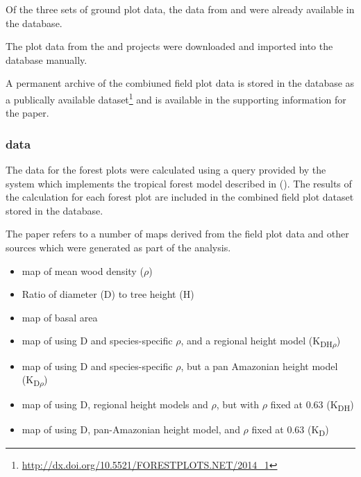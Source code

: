 \documentclass{article}
\begin{document}
Of the three sets of ground plot data, the data from \cite{rainfor} and
\cite{atdn} were already available in the \cite{forest-plots} database.

The plot data from the \cite{team} and \cite{ppbio} projects were
downloaded and imported into the \cite{forest-plots} database manually.

A permanent archive of the combiuned field plot data
is stored in the \cite{forest-plots} database
as a publically available dataset\footnote{\url{http://dx.doi.org/10.5521/FORESTPLOTS.NET/2014_1}}
and is available in the supporting information for the paper. 

\subsubsection{\cite{term-agb} data}

The \cite{term-agb} data for the forest plots were calculated
using a \cite{comp-lang-sql} query provided by the \cite{forest-plots}
system which implements the tropical forest model described in
 (\cite{chave-2005}).
The results of the \cite{term-agb} calculation for each
forest plot are included in the combined field plot dataset
stored in the \cite{forest-plots} database.

The paper refers to a number of maps derived from the field plot data
and other sources which were generated as part of the analysis.

\begin{itemize}
\item \cite{kriged} map of mean wood density ($\rho$)
\item Ratio of diameter (D) to tree height (H) \cite{feldpausch-2012}
\item \cite{kriged} map of basal area
\item \cite{kriged} map of \cite{term-agb} using D and species-specific $\rho$, and a regional height model (K\textsubscript{DH$\rho$})
\item \cite{kriged} map of \cite{term-agb} using D and species-specific $\rho$, but a pan Amazonian height model (K\textsubscript{D$\rho$})
\item \cite{kriged} map of \cite{term-agb} using D, regional height models and $\rho$, but with $\rho$ fixed at 0.63 (K\textsubscript{DH})
\item \cite{kriged} map of \cite{term-agb} using D, pan-Amazonian height model, and $\rho$ fixed at 0.63 (K\textsubscript{D})
\end{itemize}
\end{document}
